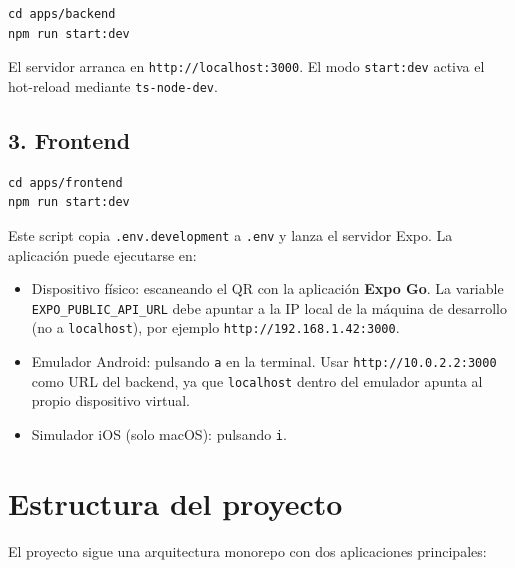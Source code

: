 \begin{lstlisting}
cd apps/backend
npm run start:dev
\end{lstlisting}

El servidor arranca en \texttt{http://localhost:3000}. El modo \texttt{start:dev} activa el hot-reload mediante \texttt{ts-node-dev}.

\subsection{3. Frontend}

\begin{lstlisting}
cd apps/frontend
npm run start:dev
\end{lstlisting}

Este script copia \texttt{.env.development} a \texttt{.env} y lanza el servidor Expo. La aplicación puede ejecutarse en:
\begin{itemize}
    \item Dispositivo físico: escaneando el QR con la aplicación \textbf{Expo Go}. La variable \texttt{EXPO\_PUBLIC\_API\_URL} debe apuntar a la IP local de la máquina de desarrollo (no a \texttt{localhost}), por ejemplo \texttt{http://192.168.1.42:3000}.
    \item Emulador Android: pulsando \texttt{a} en la terminal. Usar \texttt{http://10.0.2.2:3000} como URL del backend, ya que \texttt{localhost} dentro del emulador apunta al propio dispositivo virtual.
    \item Simulador iOS (solo macOS): pulsando \texttt{i}.
\end{itemize}

\section{Estructura del proyecto}

El proyecto sigue una arquitectura monorepo con dos aplicaciones principales:

